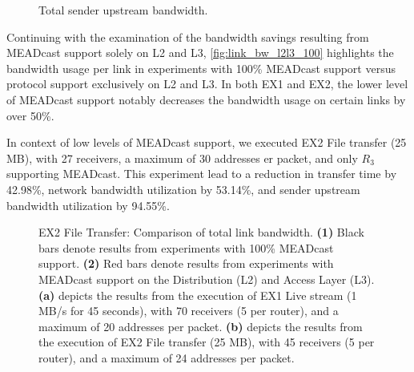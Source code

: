 \begin{figure}
    \begin{center}
        
    \end{center}
    \caption[Total sender upstream bandwidth]{Total sender upstream bandwidth.}
    \label{fig:upstreamcmp}
\end{figure}

Continuing with the examination of the bandwidth savings resulting from
    MEADcast support solely on L2 and L3, \autoref{fig:link_bw_l2l3_100}
    highlights the bandwidth usage per link in experiments with 100\% MEADcast
    support versus protocol support exclusively on L2 and L3.
In both EX1 and EX2, the lower level of MEADcast support notably decreases
    the bandwidth usage on certain links by over 50\%.
    
In context of low levels of MEADcast support, we executed EX2 File transfer
    (25 MB), with 27 receivers, a maximum of 30 addresses er packet, and only
    $R_3$ supporting MEADcast.
This experiment lead to a reduction in transfer time by 42.98\%, network
    bandwidth utilization by 53.14\%, and sender upstream bandwidth utilization
    by 94.55\%.

\begin{figure}
    \begin{center}
        
    \end{center}
    \caption[EX2 File Transfer: Comparison of total link bandwidth]{
        EX2 File Transfer: Comparison of total link bandwidth.
        \textbf{(1)} Black bars denote results from experiments with 100\%
            MEADcast support.
        \textbf{(2)} Red bars denote results from experiments with MEADcast
            support on the Distribution (L2) and Access Layer (L3).
        \textbf{(a)} depicts the results from the execution of EX1 Live
            stream (1 MB/s for 45 seconds), with 70 receivers (5 per router),
            and a maximum of 20 addresses per packet.
        \textbf{(b)} depicts the results from the execution of EX2 File
            transfer (25 MB), with 45 receivers (5 per router), and a maximum
            of 24 addresses per packet.
    }
    \label{fig:link_bw_l2l3_100}
\end{figure}



